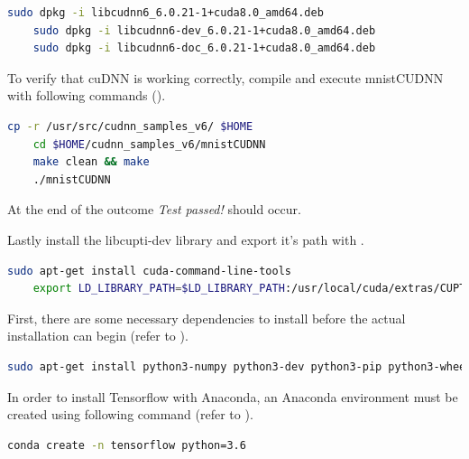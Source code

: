 \begin{minipage}{\linewidth}
\begin{lstlisting}[caption=Installation of cuDNN, label=list:cuDNN, language=bash]
	sudo dpkg -i libcudnn6_6.0.21-1+cuda8.0_amd64.deb
	sudo dpkg -i libcudnn6-dev_6.0.21-1+cuda8.0_amd64.deb
	sudo dpkg -i libcudnn6-doc_6.0.21-1+cuda8.0_amd64.deb
\end{lstlisting}
\end{minipage}

To verify that cuDNN is working correctly, compile and execute mnistCUDNN with following commands ().

\begin{minipage}{\linewidth}
\begin{lstlisting}[caption=Verification of cuDNN, label=list:cuDNNverify, language=bash]
	cp -r /usr/src/cudnn_samples_v6/ $HOME
	cd $HOME/cudnn_samples_v6/mnistCUDNN
	make clean && make
	./mnistCUDNN
\end{lstlisting}
\end{minipage}

At the end of the outcome \textit{Test passed!} should occur.

Lastly install the libcupti-dev library  and export it's path with .

\begin{minipage}{\linewidth}
\begin{lstlisting}[caption=Verification of cuDNN, label=list:libcupti, language=bash]
	sudo apt-get install cuda-command-line-tools
	export LD_LIBRARY_PATH=$LD_LIBRARY_PATH:/usr/local/cuda/extras/CUPTI/lib64
\end{lstlisting}
\end{minipage}


First, there are some necessary dependencies to install before the actual installation can begin (refer to ).
\begin{lstlisting}[caption=Installing the dependecies for Tensorflow based on Python 3.n, label=list:python_dependencies, language=bash]
	sudo apt-get install python3-numpy python3-dev python3-pip python3-wheel
\end{lstlisting}

In order to install Tensorflow with Anaconda, an Anaconda environment must be created using following command (refer to ).

\begin{lstlisting}[caption=Creating an Anaconda environment, label=list:tensorflow_anaconda, language=bash]
	conda create -n tensorflow python=3.6
\end{lstlisting}

